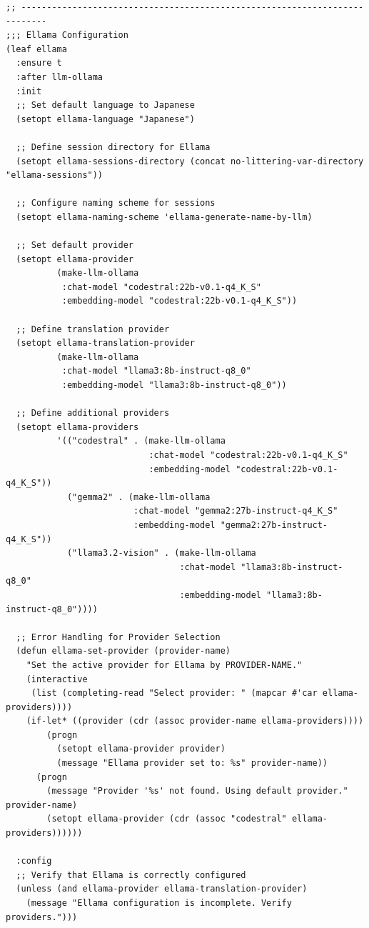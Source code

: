 \documentclass[11pt]{article}
\begin{document}
\begin{verbatim}
;; ---------------------------------------------------------------------------
;;; Ellama Configuration
(leaf ellama
  :ensure t
  :after llm-ollama
  :init
  ;; Set default language to Japanese
  (setopt ellama-language "Japanese")

  ;; Define session directory for Ellama
  (setopt ellama-sessions-directory (concat no-littering-var-directory "ellama-sessions"))

  ;; Configure naming scheme for sessions
  (setopt ellama-naming-scheme 'ellama-generate-name-by-llm)

  ;; Set default provider
  (setopt ellama-provider
          (make-llm-ollama
           :chat-model "codestral:22b-v0.1-q4_K_S"
           :embedding-model "codestral:22b-v0.1-q4_K_S"))

  ;; Define translation provider
  (setopt ellama-translation-provider
          (make-llm-ollama
           :chat-model "llama3:8b-instruct-q8_0"
           :embedding-model "llama3:8b-instruct-q8_0"))

  ;; Define additional providers
  (setopt ellama-providers
          '(("codestral" . (make-llm-ollama
                            :chat-model "codestral:22b-v0.1-q4_K_S"
                            :embedding-model "codestral:22b-v0.1-q4_K_S"))
            ("gemma2" . (make-llm-ollama
                         :chat-model "gemma2:27b-instruct-q4_K_S"
                         :embedding-model "gemma2:27b-instruct-q4_K_S"))
            ("llama3.2-vision" . (make-llm-ollama
                                  :chat-model "llama3:8b-instruct-q8_0"
                                  :embedding-model "llama3:8b-instruct-q8_0"))))

  ;; Error Handling for Provider Selection
  (defun ellama-set-provider (provider-name)
    "Set the active provider for Ellama by PROVIDER-NAME."
    (interactive
     (list (completing-read "Select provider: " (mapcar #'car ellama-providers))))
    (if-let* ((provider (cdr (assoc provider-name ellama-providers))))
        (progn
          (setopt ellama-provider provider)
          (message "Ellama provider set to: %s" provider-name))
      (progn
        (message "Provider '%s' not found. Using default provider." provider-name)
        (setopt ellama-provider (cdr (assoc "codestral" ellama-providers))))))

  :config
  ;; Verify that Ellama is correctly configured
  (unless (and ellama-provider ellama-translation-provider)
    (message "Ellama configuration is incomplete. Verify providers.")))
\end{verbatim}
\end{document}
